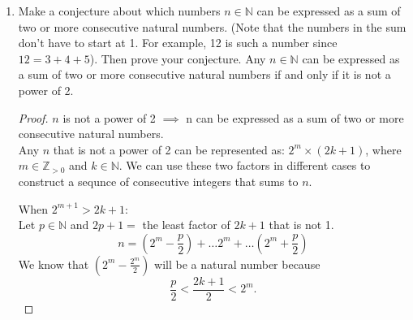 \documentclass[12pt,a4paper,reqno,parskip=full]{amsart}
\numberwithin{equation}{section}
\theoremstyle{plain}
\theoremstyle{definition}
\begin{document}
\begin{enumerate}
\begin{proof}
          Assume $A$, $B$, $C$, and $D$ are all non-empty have no duplicate elements between them.
          \[|(A\times B)\cup(C\times D)| = |A| * |B| + |C| * |D|\]
          \begin{align*}
            |(A\cup C)\times(B\cup D)| & = (|A| + |C|) * (|B| + |D|)                     \\
                                       & = |A| * |B| + |C| * |D| + |A| * |D| + |B| * |C| \\
          \end{align*}
          \begin{align*}
            |A| * |B| + |C| * |D| & = |A| * |B| + |C| * |D| + |A| * |D| + |B| * |C| \\
            0                     & = |A| * |D| + |B| * |C|
          \end{align*}
          Clearly, the conjecture does not hold in this case.
        \end{proof}
  \item Make a conjecture about which numbers $n\in\mathbb{N}$ can be expressed as a sum of two or
        more consecutive natural numbers. (Note that the numbers in the sum don't have to start at
        1. For example, 12 is such a number since $12=3+4+5$). Then prove your conjecture.
        \conjecture Any $n\in\mathbb{N}$ can be expressed as a sum of two or more consecutive
        natural numbers if and only if it is not a power of 2.
        \begin{proof}
          $n$ is not a power of 2 $\implies$
          n can be expressed as a sum of two or more consecutive natural numbers. \\
          Any $n$ that is not a power of 2 can be represented as: $2^m\times (2k + 1)$, where
          $m\in\mathbb{Z}_{>0}$ and $k\in\mathbb{N}$. We can use these two factors in different
          cases to construct a sequnce of consecutive integers that sums to $n$.

          When $2^{m + 1} > 2k + 1$: \\
          Let $p\in\mathbb{N}$ and $2p + 1 = $ the least factor of $2k + 1$ that is not 1.
          \[n = \left(2^m - \frac{p}{2}\right) +\dots 2^m+\dots \left(2^m + \frac{p}{2}\right)\]
          We know that $\displaystyle \left(2^m - \frac{2^m}{2}\right)$ will be a natural number
          because \[\frac{p}{2} < \frac{2k + 1}{2} < 2^m.\]


\end{proof}
\end{enumerate}
\end{document}
